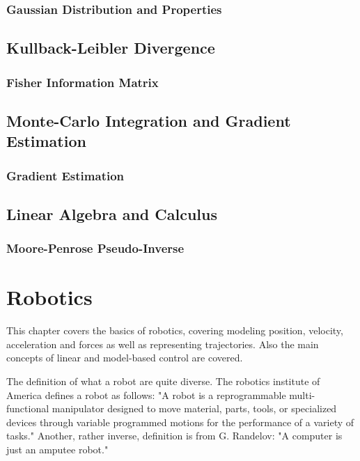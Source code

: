 		\subsection{Gaussian Distribution and Properties} %

	\section{Kullback-Leibler Divergence} %

		\subsection{Fisher Information Matrix} %

	\section{Monte-Carlo Integration and Gradient Estimation} %

		\subsection{Gradient Estimation} %

	\section{Linear Algebra and Calculus} %

		\subsection{Moore-Penrose Pseudo-Inverse} %

\chapter{Robotics}
	This chapter covers the basics of robotics, covering modeling position, velocity, acceleration and forces as well as representing trajectories. Also the main concepts of linear and model-based control are covered.

	The definition of what a robot are quite diverse. The robotics institute of America defines a robot as follows: "A robot is a reprogrammable multi-functional manipulator designed to move material, parts, tools, or specialized devices through variable programmed motions for the performance of a variety of tasks." Another, rather inverse, definition is from G. Randelov: "A computer is just an amputee robot."

